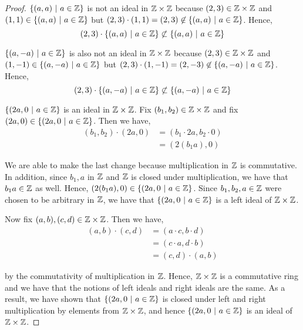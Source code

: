 \documentclass[11pt, reqno]{amsart}
\theoremstyle{plain}
\theoremstyle{definition}
\theoremstyle{example}
\begin{document}
\begin{enumerate}[1.]
\begin{enumerate}[(a)]
\begin{proof}
$\{(a, a) \ | \ a \in \mathbb{Z}\}$ is not an ideal in $\mathbb{Z} \times \mathbb{Z}$ because $(2, 3) \in \mathbb{Z} \times \mathbb{Z}$ and $(1, 1) \in \{(a, a) \ | \ a \in \mathbb{Z}\}$ but $(2, 3) \cdot (1, 1) = (2, 3) \not\in \{(a, a) \ | \ a \in \mathbb{Z}\}$. Hence, $$(2, 3) \cdot \{(a, a) \ | \ a \in \mathbb{Z}\} \not \subset \{(a, a) \ | \ a \in \mathbb{Z}\}$$

\par
$\{(a, -a) \ | \ a \in \mathbb{Z}\}$ is also not an ideal in $\mathbb{Z} \times \mathbb{Z}$ because $(2, 3) \in \mathbb{Z} \times \mathbb{Z}$ and $(1, -1) \in \{(a, -a) \ | \ a \in \mathbb{Z}\}$ but $(2, 3) \cdot (1, -1) = (2, -3) \not\in \{(a, -a) \ | \ a \in \mathbb{Z}\}$. Hence, $$(2, 3) \cdot \{(a, -a) \ | \ a \in \mathbb{Z}\} \not \subset \{(a, -a) \ | \ a \in \mathbb{Z}\}$$

\par
$\{(2a, 0 \ | \ a \in \mathbb{Z}\}$ is an ideal in $\mathbb{Z} \times \mathbb{Z}$. Fix $ (b_1, b_2) \in \mathbb{Z} \times \mathbb{Z}$ and fix $(2a, 0) \in \{(2a, 0 \ | \ a \in \mathbb{Z}\}$. Then we have,
\begin{align*}
(b_1, b_2) \cdot (2a, 0) &= (b_1 \cdot 2a, b_2 \cdot 0)\\
&= (2(b_1a), 0)
\end{align*}

We are able to make the last change because multiplication in $\mathbb{Z}$ is commutative. In addition, since $b_1, a$ in $\mathbb{Z}$ and $\mathbb{Z}$ is closed under multiplication, we have that $b_1a \in \mathbb{Z}$ as well. Hence, $(2(b_1a), 0) \in \{(2a, 0 \ | \ a \in \mathbb{Z}\}$. Since $b_1, b_2, a \in \mathbb{Z}$ were chosen to be arbitrary in $\mathbb{Z}$, we have that $\{(2a, 0 \ | \ a \in \mathbb{Z}\}$ is a left ideal of $\mathbb{Z} \times \mathbb{Z}$.

\par
Now fix $(a, b), (c, d) \in \mathbb{Z} \times \mathbb{Z}$. Then we have,
\begin{align*}
(a, b) \cdot (c, d) &= (a \cdot c, b \cdot d)\\
&= (c \cdot a, d \cdot b)\\
&= (c, d) \cdot (a, b)
\end{align*}

by the commutativity of multiplication in $\mathbb{Z}$. Hence, $\mathbb{Z} \times \mathbb{Z}$ is a commutative ring and we have that the notions of left ideals and right ideals are the same. As a result, we have shown that $\{(2a, 0 \ | \ a \in \mathbb{Z}\}$ is closed under left and right multiplication by elements from $\mathbb{Z} \times \mathbb{Z}$, and hence $\{(2a, 0 \ | \ a \in \mathbb{Z}\}$ is an ideal of $\mathbb{Z} \times \mathbb{Z}$.
\end{proof}
\end{enumerate}


\end{enumerate}
\end{document}
